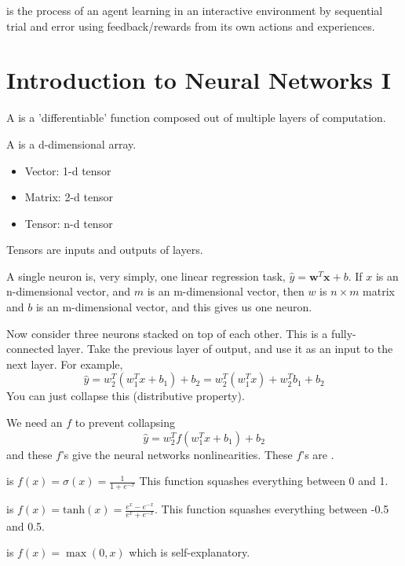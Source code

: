 \documentclass[12pt]{scrartcl}
\begin{document}
\begin{definition}
   is the process of an agent learning in an interactive environment
  by sequential trial and error using feedback/rewards from its own actions and experiences.
\end{definition}

\section{Introduction to Neural Networks I}

\begin{definition}
  A  is a 'differentiable' function composed out of multiple layers of computation.
\end{definition}

\begin{definition}
  A  is a d-dimensional array.
  \begin{itemize}
    \item Vector: 1-d tensor
    \item Matrix: 2-d tensor
    \item Tensor: n-d tensor
  \end{itemize}
  Tensors are inputs and outputs of layers. 
\end{definition}

\begin{note}
  A single neuron is, very simply, one linear regression task, $\hat{y} = \textbf{w}^T \textbf{x} + b$.
  If $x$ is an n-dimensional vector, and $m$ is an m-dimensional vector, then 
  $w$ is $n\times m$ matrix and $b$ is an m-dimensional vector, and this gives us one neuron.

  \hfill

  Now consider three neurons stacked on top of each other. This is a fully-connected layer. 
  Take the previous layer of output, and use it as an input to the next layer.
  For example,
  \[\hat{y} = w_2^T(w_1^T x + b_1) + b_2 = w_2^T(w_1^T x) + w_2^T b_1 + b_2\]
  You can just collapse this (distributive property).
\end{note}

\begin{note}
  We need an $f$ to prevent collapsing
  \[\hat{y} = w_2^T f(w_1^T x + b_1) + b_2\]
  and these $f$'s give the neural networks nonlinearities. These $f$'s are 
  .
\end{note}

\begin{definition}
   is $f(x) = \sigma(x) = \frac{1}{1 + e^{-x}}$ This function squashes
  everything between 0 and 1. 
\end{definition}

\begin{definition}

   is $f(x) = \text{tanh}(x) = \frac{e^x - e^{-x}}{e^x + e^{-x}}$. This function
  squashes everything between -0.5 and 0.5.
\end{definition}

\begin{definition}
   is $f(x) = \max(0, x)$ which is self-explanatory.
\end{definition}
\end{document}
